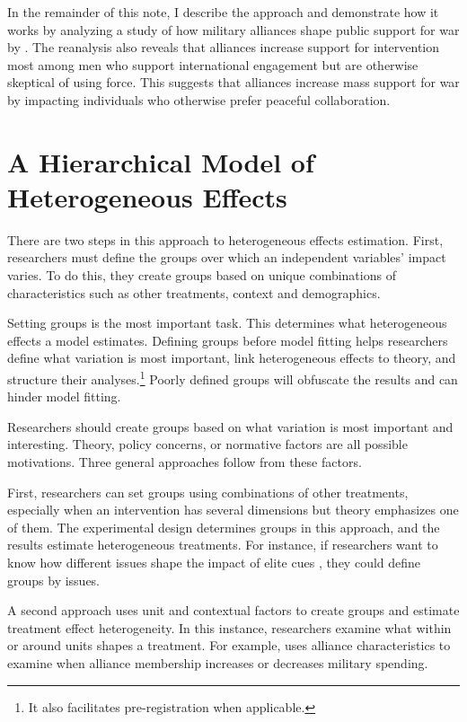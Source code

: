 \documentclass[12pt]{article}
\begin{document}
In the remainder of this note, I describe the approach and demonstrate how it works by analyzing a study of how military alliances shape public support for war by \citet{TomzWeeks2021}. 
The reanalysis also reveals that alliances increase support for intervention most among men who support international engagement but are otherwise skeptical of using force. 
This suggests that alliances increase mass support for war by impacting individuals who otherwise prefer peaceful collaboration. 



\section{A Hierarchical Model of Heterogeneous Effects}


There are two steps in this approach to heterogeneous effects estimation. 
First, researchers must define the groups over which an independent variables' impact varies. 
To do this, they create groups based on unique combinations of characteristics such as other treatments, context and demographics.


Setting groups is the most important task.
This determines what heterogeneous effects a model estimates. 
Defining groups before model fitting helps researchers define what variation is most important, link heterogeneous effects to theory, and structure their analyses.\footnote{It also facilitates pre-registration when applicable.}
Poorly defined groups will obfuscate the results and can hinder model fitting.   


Researchers should create groups based on what variation is most important and interesting. 
Theory, policy concerns, or normative factors are all possible motivations.
Three general approaches follow from these factors.  


First, researchers can set groups using combinations of other treatments, especially when an intervention has several dimensions but theory emphasizes one of them. 
The experimental design determines groups in this approach, and the results estimate heterogeneous treatments.   
For instance, if researchers want to know how different issues shape the impact of elite cues \citep{GuisingerSaunders2017}, they could define groups by issues. 


A second approach uses unit and contextual factors to create groups and estimate treatment effect heterogeneity. 
In this instance, researchers examine what within or around units shapes a treatment.
For example, \citet{Alley2021isq} uses alliance characteristics to examine when alliance membership increases or decreases military spending.
\end{document}
